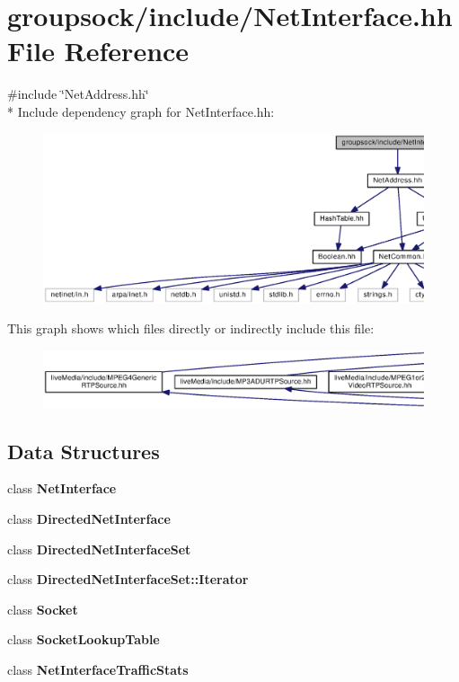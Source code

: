\section{groupsock/include/\+Net\+Interface.hh File Reference}
\label{NetInterface_8hh}
{\ttfamily \#include \char`\"{}Net\+Address.\+hh\char`\"{}}\\*
Include dependency graph for Net\+Interface.\+hh\+:
\nopagebreak
\begin{figure}[H]
\begin{center}
\leavevmode
\includegraphics[width=350pt]{NetInterface_8hh__incl}
\end{center}
\end{figure}
This graph shows which files directly or indirectly include this file\+:
\nopagebreak
\begin{figure}[H]
\begin{center}
\leavevmode
\includegraphics[width=350pt]{NetInterface_8hh__dep__incl}
\end{center}
\end{figure}
\subsection*{Data Structures}
\begin{DoxyCompactItemize}
\item 
class {\bf Net\+Interface}
\item 
class {\bf Directed\+Net\+Interface}
\item 
class {\bf Directed\+Net\+Interface\+Set}
\item 
class {\bf Directed\+Net\+Interface\+Set\+::\+Iterator}
\item 
class {\bf Socket}
\item 
class {\bf Socket\+Lookup\+Table}
\item 
class {\bf Net\+Interface\+Traffic\+Stats}
\end{DoxyCompactItemize}
